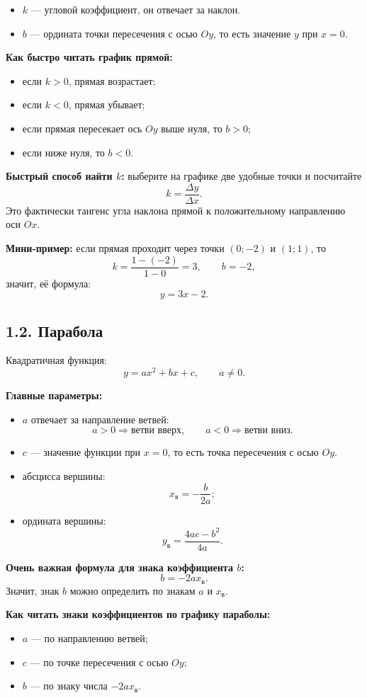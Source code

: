 \documentclass[a4paper,12pt]{article}
\begin{document}
\begin{itemize}
  \item \(k\) --- угловой коэффициент, он отвечает за наклон.
  \item \(b\) --- ордината точки пересечения с осью \(Oy\), то есть значение \(y\) при \(x=0\).
\end{itemize}

\textbf{Как быстро читать график прямой:}
\begin{itemize}
  \item если \(k>0\), прямая возрастает;
  \item если \(k<0\), прямая убывает;
  \item если прямая пересекает ось \(Oy\) выше нуля, то \(b>0\);
  \item если ниже нуля, то \(b<0\).
\end{itemize}

\textbf{Быстрый способ найти \(k\):}
выберите на графике две удобные точки и посчитайте
\[
k=\frac{\Delta y}{\Delta x}.
\]
Это фактически тангенс угла наклона прямой к положительному направлению оси \(Ox\).

\textbf{Мини-пример:}
если прямая проходит через точки \((0;-2)\) и \((1;1)\), то
\[
k=\frac{1-(-2)}{1-0}=3,\qquad b=-2,
\]
значит, её формула:
\[
y=3x-2.
\]

\subsection*{1.2. Парабола}
Квадратичная функция:
\[
y=ax^2+bx+c,\qquad a\neq 0.
\]

\textbf{Главные параметры:}
\begin{itemize}
  \item \(a\) отвечает за направление ветвей:
  \[
  a>0 \Rightarrow \text{ветви вверх}, \qquad a<0 \Rightarrow \text{ветви вниз}.
  \]
  \item \(c\) --- значение функции при \(x=0\), то есть точка пересечения с осью \(Oy\).
  \item абсцисса вершины:
  \[
  x_{\text{в}}=-\frac{b}{2a};
  \]
  \item ордината вершины:
  \[
  y_{\text{в}}=\frac{4ac-b^2}{4a}.
  \]
\end{itemize}

\textbf{Очень важная формула для знака коэффициента \(b\):}
\[
b=-2ax_{\text{в}}.
\]
Значит, знак \(b\) можно определить по знакам \(a\) и \(x_{\text{в}}\).

\textbf{Как читать знаки коэффициентов по графику параболы:}
\begin{itemize}
  \item \(a\) --- по направлению ветвей;
  \item \(c\) --- по точке пересечения с осью \(Oy\);
  \item \(b\) --- по знаку числа \(-2ax_{\text{в}}\).
\end{itemize}
\end{document}
